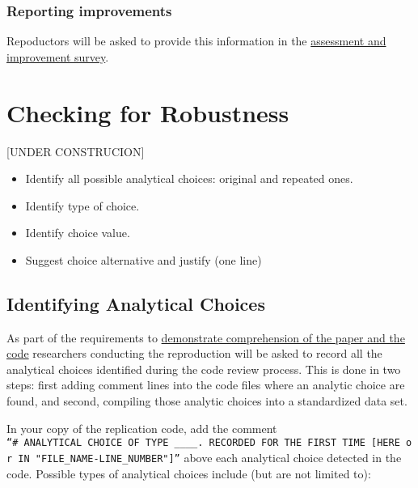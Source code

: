 \documentclass[]{book}
\providecommand{\tightlist}{%
  \setlength{\itemsep}{0pt}\setlength{\parskip}{0pt}}
\begin{document}
\hypertarget{reporting-improvements}{%
\subsection{Reporting improvements}\label{reporting-improvements}}

Repoductors will be asked to provide this information in the \href{ADD\%20LINK}{assessment and improvement survey}.

\hypertarget{robust}{%
\chapter{Checking for Robustness}\label{robust}}

{[}UNDER CONSTRUCION{]}

\begin{itemize}
\tightlist
\item
  Identify all possible analytical choices: original and repeated ones.\\
\item
  Identify type of choice.\\
\item
  Identify choice value.
\item
  Suggest choice alternative and justify (one line)
\end{itemize}

\hypertarget{id-analy}{%
\section{Identifying Analytical Choices}\label{id-analy}}

As part of the requirements to \href{requirements_comprehension.md}{demonstrate comprehension of the paper and the code} researchers conducting the reproduction will be asked to record all the analytical choices identified during the code review process. This is done in two steps: first adding comment lines into the code files where an analytic choice are found, and second, compiling those analytic choices into a standardized data set.

In your copy of the replication code, add the comment \texttt{“\#\ ANALYTICAL\ CHOICE\ OF\ TYPE\ \_\_\_\_.\ RECORDED\ FOR\ THE\ FIRST\ TIME\ {[}HERE\ or\ IN\ "FILE\_NAME-LINE\_NUMBER"{]}”} above each analytical choice detected in the code. Possible types of analytical choices include (but are not limited to):
\end{document}
